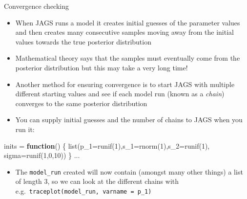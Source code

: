 \documentclass[
  ignorenonframetext,
  aspectratio=169]{beamer}
\newenvironment{Shaded}{\begin{snugshade}}{\end{snugshade}}
\newcommand{\ControlFlowTok}[1]{\textcolor[rgb]{0.13,0.29,0.53}{\textbf{#1}}}
\newcommand{\DecValTok}[1]{\textcolor[rgb]{0.00,0.00,0.81}{#1}}
\newcommand{\FunctionTok}[1]{\textcolor[rgb]{0.00,0.00,0.00}{#1}}
\newcommand{\NormalTok}[1]{#1}
\newcommand{\OtherTok}[1]{\textcolor[rgb]{0.56,0.35,0.01}{#1}}
\newcommand{\StringTok}[1]{\textcolor[rgb]{0.31,0.60,0.02}{#1}}
\providecommand{\tightlist}{%
  \setlength{\itemsep}{0pt}\setlength{\parskip}{0pt}}
\begin{document}
\begin{frame}[fragile]{Convergence checking}
\protect\hypertarget{convergence-checking}{}
\small

\begin{itemize}
\tightlist
\item
  When JAGS runs a model it creates initial guesses of the parameter
  values and then creates many consecutive samples moving away from the
  initial values towards the true posterior distribution
\item
  Mathematical theory says that the samples must eventually come from
  the posterior distribution but this may take a very long time!
\item
  Another method for ensuring convergence is to start JAGS with multiple
  different starting values and see if each model run (known as a
  \emph{chain}) converges to the same posterior distribution
\item
  You can supply initial guesses and the number of chains to JAGS when
  you run it:
\end{itemize}

\begin{Shaded}
\begin{Highlighting}[]
\NormalTok{inits }\OtherTok{=} \ControlFlowTok{function}\NormalTok{() \{}
  \FunctionTok{list}\NormalTok{(}\StringTok{\textquotesingle{}p\_1\textquotesingle{}}\OtherTok{=}\FunctionTok{runif}\NormalTok{(}\DecValTok{1}\NormalTok{),}\StringTok{\textquotesingle{}s\_1\textquotesingle{}}\OtherTok{=}\FunctionTok{rnorm}\NormalTok{(}\DecValTok{1}\NormalTok{),}\StringTok{\textquotesingle{}s\_2\textquotesingle{}}\OtherTok{=}\FunctionTok{runif}\NormalTok{(}\DecValTok{1}\NormalTok{),}
       \StringTok{\textquotesingle{}sigma\textquotesingle{}}\OtherTok{=}\FunctionTok{runif}\NormalTok{(}\DecValTok{1}\NormalTok{,}\DecValTok{0}\NormalTok{,}\DecValTok{10}\NormalTok{))}
\NormalTok{\}}
\NormalTok{...}
\end{Highlighting}
\end{Shaded}

\begin{itemize}
\tightlist
\item
  The \texttt{model\_run} created will now contain (amongst many other
  things) a list of length 3, so we can look at the different chains
  with
  e.g.~\texttt{traceplot(model\_run,\ varname\ =\ \textquotesingle{}p\_1\textquotesingle{})}
\end{itemize}
\end{frame}
\end{document}
